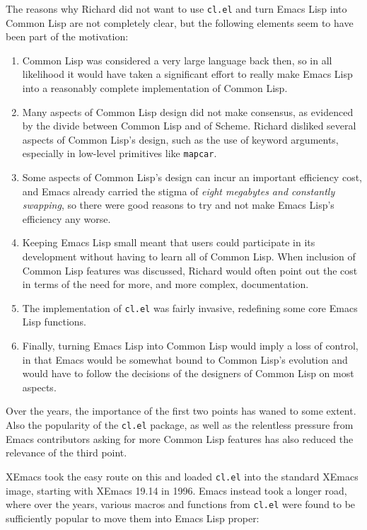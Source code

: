 \documentclass[format=acmsmall, review]{acmart}
\newcommand \Elisp {Emacs Lisp}
\begin{document}
The reasons why Richard did not want to use \texttt{cl.el} and turn \Elisp{}
into Common Lisp are not completely clear, but the following elements seem
to have been part of the motivation:
\begin{enumerate}
\item Common Lisp was considered a very large language back then, so in all
  likelihood it would have taken a significant effort to really make
  \Elisp{} into a reasonably complete implementation of Common Lisp.
\item Many aspects of Common Lisp design did not make consensus, as
  evidenced by the divide between Common Lisp and of Scheme.
  Richard disliked several aspects of Common Lisp's design, such as the use of
  keyword arguments, especially in low-level primitives like
  \texttt{mapcar}.
\item Some aspects of Common Lisp's design can incur an important efficiency
  cost, and Emacs already carried the stigma of \emph{eight megabytes and
    constantly swapping}, so there were good reasons to try and not make
  \Elisp{}'s efficiency any worse.
\item Keeping \Elisp{} small meant that users could participate in its
  development without having to learn all of Common Lisp.  When inclusion of
  Common Lisp features was discussed, Richard would often point out the cost
  in terms of the need for more, and more complex, documentation.
\item The implementation of \texttt{cl.el} was fairly invasive, redefining
  some core \Elisp{} functions.
\item Finally, turning \Elisp{} into Common Lisp would imply a loss of control,
  in that Emacs would be somewhat bound to Common Lisp's evolution and would
  have to follow the decisions of the designers of Common Lisp on most aspects.
\end{enumerate}
Over the years, the importance of the first two points has waned to some
extent.  Also the popularity of the \texttt{cl.el} package, as well as the
relentless pressure from Emacs contributors asking for more Common Lisp
features has also reduced the relevance of the third point.

XEmacs took the easy route on this and loaded \texttt{cl.el} into the
standard XEmacs image, starting with XEmacs 19.14 in 1996.  Emacs instead
took a longer road, where over the years, various macros and functions from
\texttt{cl.el} were found to be sufficiently popular to move them into
\Elisp{} proper:
\end{document}

